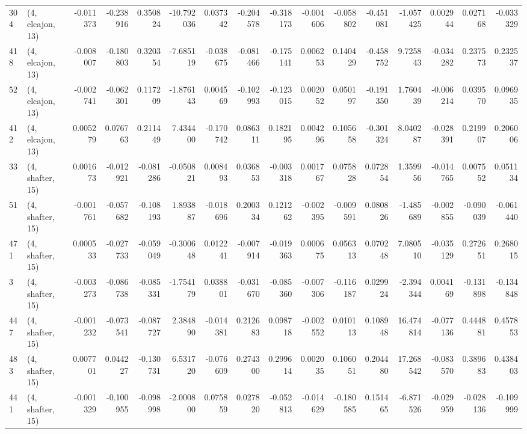 \begin{tabular}{llrrrrrrrrrrrrrr}
304 &  (4, elcajon, 13) &  -0.011373 & -0.238916 &  0.350824 &   -10.792036 &   0.037342 &  -0.204578 &  -0.318173 & -0.004606 & -0.058802 & -0.451081 &   -1.057425 &  0.002944 &  0.027168 & -0.033329 \\
418 &  (4, elcajon, 13) &  -0.008007 & -0.180803 &  0.320354 &    -7.685119 &  -0.038675 &  -0.081466 &  -0.175141 &  0.006253 &  0.140429 & -0.458752 &    9.725843 & -0.034282 &  0.237573 &  0.232537 \\
52  &  (4, elcajon, 13) &  -0.002741 & -0.062301 &  0.117209 &    -1.876143 &   0.004569 &  -0.102993 &  -0.123015 &  0.002052 &  0.050197 & -0.191350 &    1.760439 & -0.006214 &  0.039570 &  0.096935 \\
412 &  (4, elcajon, 13) &   0.005279 &  0.076763 &  0.211449 &     7.434400 &  -0.170742 &   0.086311 &   0.182195 &  0.004296 &  0.105658 & -0.301324 &    8.040287 & -0.028391 &  0.219907 &  0.206006 \\
33  &  (4, shafter, 15) &   0.001673 & -0.012921 & -0.081286 &    -0.050821 &   0.008493 &   0.036853 &  -0.003318 &  0.001767 &  0.075828 &  0.072854 &    1.359956 & -0.014765 &  0.007552 &  0.051134 \\
51  &  (4, shafter, 15) &  -0.001761 & -0.057682 & -0.108193 &     1.893887 &  -0.018696 &   0.200334 &   0.121262 & -0.002395 & -0.009591 &  0.080826 &   -1.485689 & -0.002855 & -0.090039 & -0.061440 \\
471 &  (4, shafter, 15) &   0.000533 & -0.027733 & -0.059049 &    -0.300648 &   0.012241 &  -0.007914 &  -0.019363 &  0.000675 &  0.056313 &  0.070248 &    7.080510 & -0.035129 &  0.272651 &  0.268015 \\
3   &  (4, shafter, 15) &  -0.003273 & -0.086738 & -0.085331 &    -1.754179 &   0.038801 &  -0.031670 &  -0.085360 & -0.007306 & -0.116187 &  0.029924 &   -2.394344 &  0.004169 & -0.131898 & -0.134848 \\
447 &  (4, shafter, 15) &  -0.001232 & -0.073541 & -0.087727 &     2.384890 &  -0.014381 &   0.212683 &   0.098718 & -0.002552 &  0.010113 &  0.108948 &   16.474814 & -0.077136 &  0.444881 &  0.457853 \\
483 &  (4, shafter, 15) &   0.007701 &  0.044227 & -0.130731 &     6.531720 &  -0.076609 &   0.274300 &   0.299614 &  0.002035 &  0.106051 &  0.204480 &   17.268542 & -0.083570 &  0.389683 &  0.438403 \\
441 &  (4, shafter, 15) &  -0.001329 & -0.100955 & -0.098998 &    -2.000800 &   0.075859 &   0.027820 &  -0.052813 & -0.014629 & -0.180585 &  0.151465 &   -6.871526 & -0.029959 & -0.028136 & -0.109999 \\

\end{tabular}
